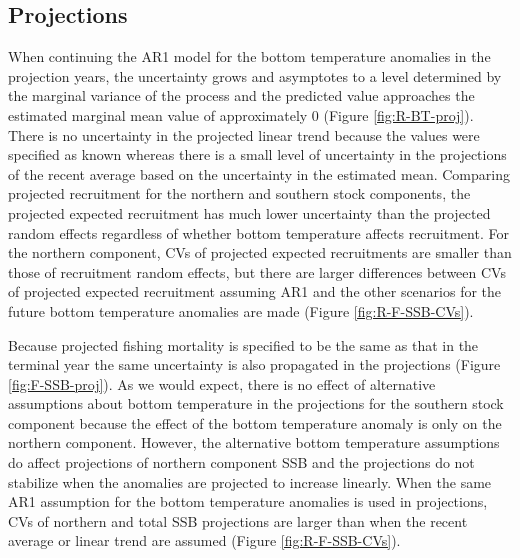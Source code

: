 \documentclass[
]{article}
\begin{document}
\hypertarget{projections-1}{%
\subsection*{Projections}\label{projections-1}}

When continuing the AR1 model for the bottom temperature anomalies in the projection years, the uncertainty grows and asymptotes to a level determined by the marginal variance of the process and the predicted value approaches the estimated marginal mean value of approximately 0 (Figure \ref{fig:R-BT-proj}). There is no uncertainty in the projected linear trend because the values were specified as known whereas there is a small level of uncertainty in the projections of the recent average based on the uncertainty in the estimated mean. Comparing projected recruitment for the northern and southern stock components, the projected expected recruitment has much lower uncertainty than the projected random effects regardless of whether bottom temperature affects recruitment. For the northern component, CVs of projected expected recruitments are smaller than those of recruitment random effects, but there are larger differences between CVs of projected expected recruitment assuming AR1 and the other scenarios for the future bottom temperature anomalies are made (Figure \ref{fig:R-F-SSB-CVs}).

Because projected fishing mortality is specified to be the same as that in the terminal year the same uncertainty is also propagated in the projections (Figure \ref{fig:F-SSB-proj}). As we would expect, there is no effect of alternative assumptions about bottom temperature in the projections for the southern stock component because the effect of the bottom temperature anomaly is only on the northern component. However, the alternative bottom temperature assumptions do affect projections of northern component SSB and the projections do not stabilize when the anomalies are projected to increase linearly. When the same AR1 assumption for the bottom temperature anomalies is used in projections, CVs of northern and total SSB projections are larger than when the recent average or linear trend are assumed (Figure \ref{fig:R-F-SSB-CVs}).
\end{document}

